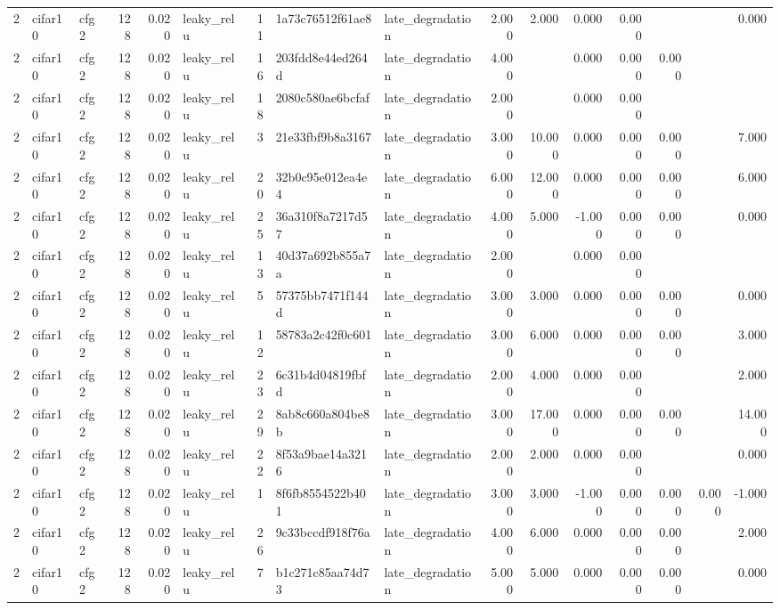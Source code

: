 \begin{table}[htbp]
{\begin{tabular}{@{}rllrrlrllrrrrrrr@{}}
2 & cifar10 & cfg2 & 128 & 0.020 & leaky\_relu & 11 & 1a73c76512f61ae8 & late\_degradation & 2.000 & 2.000 & 0.000 & 0.000 &  &  & 0.000 \\
2 & cifar10 & cfg2 & 128 & 0.020 & leaky\_relu & 16 & 203fdd8e44ed264d & late\_degradation & 4.000 &  & 0.000 & 0.000 & 0.000 &  &  \\
2 & cifar10 & cfg2 & 128 & 0.020 & leaky\_relu & 18 & 2080c580ae6bcfaf & late\_degradation & 2.000 &  & 0.000 & 0.000 &  &  &  \\
2 & cifar10 & cfg2 & 128 & 0.020 & leaky\_relu & 3 & 21e33fbf9b8a3167 & late\_degradation & 3.000 & 10.000 & 0.000 & 0.000 & 0.000 &  & 7.000 \\
2 & cifar10 & cfg2 & 128 & 0.020 & leaky\_relu & 20 & 32b0c95e012ea4e4 & late\_degradation & 6.000 & 12.000 & 0.000 & 0.000 & 0.000 &  & 6.000 \\
2 & cifar10 & cfg2 & 128 & 0.020 & leaky\_relu & 25 & 36a310f8a7217d57 & late\_degradation & 4.000 & 5.000 & -1.000 & 0.000 & 0.000 &  & 0.000 \\
2 & cifar10 & cfg2 & 128 & 0.020 & leaky\_relu & 13 & 40d37a692b855a7a & late\_degradation & 2.000 &  & 0.000 & 0.000 &  &  &  \\
2 & cifar10 & cfg2 & 128 & 0.020 & leaky\_relu & 5 & 57375bb7471f144d & late\_degradation & 3.000 & 3.000 & 0.000 & 0.000 & 0.000 &  & 0.000 \\
2 & cifar10 & cfg2 & 128 & 0.020 & leaky\_relu & 12 & 58783a2c42f0c601 & late\_degradation & 3.000 & 6.000 & 0.000 & 0.000 & 0.000 &  & 3.000 \\
2 & cifar10 & cfg2 & 128 & 0.020 & leaky\_relu & 23 & 6c31b4d04819fbfd & late\_degradation & 2.000 & 4.000 & 0.000 & 0.000 &  &  & 2.000 \\
2 & cifar10 & cfg2 & 128 & 0.020 & leaky\_relu & 29 & 8ab8c660a804be8b & late\_degradation & 3.000 & 17.000 & 0.000 & 0.000 & 0.000 &  & 14.000 \\
2 & cifar10 & cfg2 & 128 & 0.020 & leaky\_relu & 22 & 8f53a9bae14a3216 & late\_degradation & 2.000 & 2.000 & 0.000 & 0.000 &  &  & 0.000 \\
2 & cifar10 & cfg2 & 128 & 0.020 & leaky\_relu & 1 & 8f6fb8554522b401 & late\_degradation & 3.000 & 3.000 & -1.000 & 0.000 & 0.000 & 0.000 & -1.000 \\
2 & cifar10 & cfg2 & 128 & 0.020 & leaky\_relu & 26 & 9c33bccdf918f76a & late\_degradation & 4.000 & 6.000 & 0.000 & 0.000 & 0.000 &  & 2.000 \\
2 & cifar10 & cfg2 & 128 & 0.020 & leaky\_relu & 7 & b1c271c85aa74d73 & late\_degradation & 5.000 & 5.000 & 0.000 & 0.000 & 0.000 &  & 0.000 \\

\end{tabular}}
\end{table}
